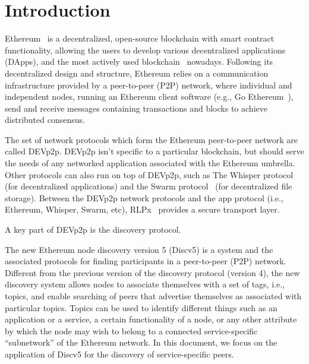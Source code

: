 
\section{Introduction}

Ethereum~\cite{} is a decentralized, open-source blockchain with smart contract functionality, allowing the users to develop various decentralized applications (DApps),  and the most actively used blockchain~\cite{bloomberg} nowadays.
Following its decentralized design and structure, Ethereum relies on a communication infrastructure provided by a peer-to-peer (P2P) network, where individual and independent nodes, running an Ethereum client software (e.g., Go Ethereum~\cite{go-ethereum}), send and receive messages  containing transactions and blocks to achieve distributed consensus.

The set of network protocols which form the Ethereum peer-to-peer network are called DEVp2p. DEVp2p isn't specific to a particular blockchain, but should serve the needs of any networked application associated with the Ethereum umbrella.
Other protocols can also run on top of DEVp2p, such as 
The Whisper protocol~\cite{} (for decentralized
applications) and the Swarm protocol~\cite{} (for decentralized file
storage).
Between the DEVp2p network protocols and the app protocol (i.e., Ethereum, Whisper, Swarm, etc), RLPx~\cite{} provides a secure transport layer. 

A key part of DEVp2p is the discovery protocol. 


The new Ethereum node discovery version 5 (Discv5) is a system and the associated protocols for finding participants in a peer-to-peer (P2P) network. Different from the previous version of the discovery protocol (version 4), the new discovery system allows nodes to associate themselves with a set of tags, i.e., topics, and enable searching of peers that advertise themselves as associated with particular topics. Topics can be used to identify different things such as an application or a service, a certain functionality of a node, or any other attribute by which the node may wish to belong to a connected service-specific “subnetwork” of the Ethereum network. In this document, we focus on the application of Discv5 for the discovery of service-specific peers.



